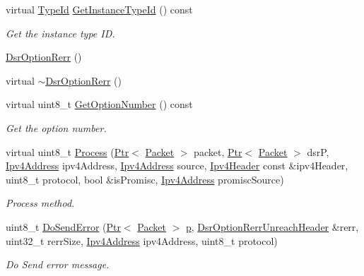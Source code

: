 \begin{DoxyCompactItemize}
\item 
virtual \hyperlink{classns3_1_1TypeId}{Type\+Id} \hyperlink{classns3_1_1dsr_1_1DsrOptionRerr_ad5d229fa56459db61b6c4c2c141c9fdc}{Get\+Instance\+Type\+Id} () const 
\begin{DoxyCompactList}\small\item\em Get the instance type ID. \end{DoxyCompactList}\item 
\hyperlink{classns3_1_1dsr_1_1DsrOptionRerr_ab3f5aa60a1bf1a439ef23ef2463c3a66}{Dsr\+Option\+Rerr} ()
\item 
virtual \hyperlink{classns3_1_1dsr_1_1DsrOptionRerr_afaafba278648019ab58f2e7b583080a1}{$\sim$\+Dsr\+Option\+Rerr} ()
\item 
virtual uint8\+\_\+t \hyperlink{classns3_1_1dsr_1_1DsrOptionRerr_acc0fe1733d9d8ef5d6d409acd9ec9e63}{Get\+Option\+Number} () const 
\begin{DoxyCompactList}\small\item\em Get the option number. \end{DoxyCompactList}\item 
virtual uint8\+\_\+t \hyperlink{classns3_1_1dsr_1_1DsrOptionRerr_a8aa7e565a18c730fcd572017f720cfac}{Process} (\hyperlink{classns3_1_1Ptr}{Ptr}$<$ \hyperlink{classns3_1_1Packet}{Packet} $>$ packet, \hyperlink{classns3_1_1Ptr}{Ptr}$<$ \hyperlink{classns3_1_1Packet}{Packet} $>$ dsrP, \hyperlink{classns3_1_1Ipv4Address}{Ipv4\+Address} ipv4\+Address, \hyperlink{classns3_1_1Ipv4Address}{Ipv4\+Address} source, \hyperlink{classns3_1_1Ipv4Header}{Ipv4\+Header} const \&ipv4\+Header, uint8\+\_\+t protocol, bool \&is\+Promisc, \hyperlink{classns3_1_1Ipv4Address}{Ipv4\+Address} promisc\+Source)
\begin{DoxyCompactList}\small\item\em Process method. \end{DoxyCompactList}\item 
uint8\+\_\+t \hyperlink{classns3_1_1dsr_1_1DsrOptionRerr_a0384af99022d7c4f59cc5f548990e827}{Do\+Send\+Error} (\hyperlink{classns3_1_1Ptr}{Ptr}$<$ \hyperlink{classns3_1_1Packet}{Packet} $>$ \hyperlink{lte__link__budget__x2__handover__measures_8m_ac9de518908a968428863f829398a4e62}{p}, \hyperlink{classns3_1_1dsr_1_1DsrOptionRerrUnreachHeader}{Dsr\+Option\+Rerr\+Unreach\+Header} \&rerr, uint32\+\_\+t rerr\+Size, \hyperlink{classns3_1_1Ipv4Address}{Ipv4\+Address} ipv4\+Address, uint8\+\_\+t protocol)
\begin{DoxyCompactList}\small\item\em Do Send error message. \end{DoxyCompactList}\end{DoxyCompactItemize}
